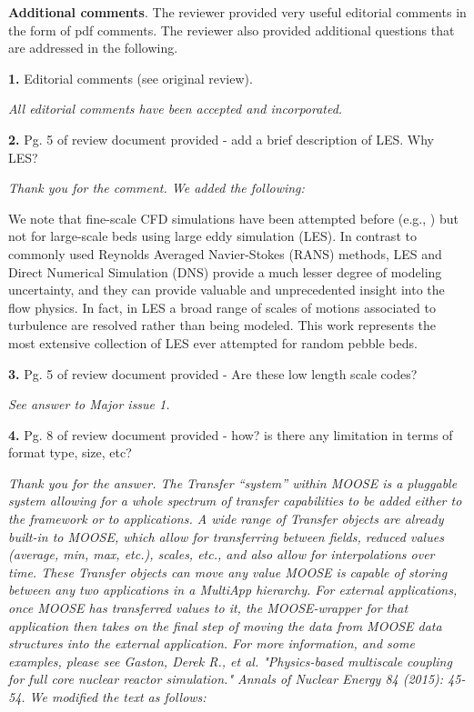 \documentclass{nseJournal}
\begin{document}
\textbf{Additional comments}.  The reviewer provided very useful editorial comments in the form of pdf comments. The reviewer also provided additional questions that are addressed in the following.

\textbf{1.} Editorial comments (see original review).

\textit{All editorial comments have been accepted and incorporated.}

\textbf{2.} Pg. 5 of review document provided - add a brief description of LES. Why LES?

\textit{Thank you for the comment. We added the following:}

We note that fine-scale CFD simulations have been attempted before (e.g., \cite{vanstaden2018}) but not for large-scale beds using large eddy simulation (LES).  In contrast to commonly used  Reynolds Averaged Navier-Stokes (RANS) methods, LES and Direct Numerical Simulation (DNS) provide a much lesser degree of modeling uncertainty, and they can provide valuable and unprecedented insight into the flow physics. In fact, in LES a broad range of scales of motions associated to turbulence are resolved rather than being modeled. This work represents the most extensive collection of LES ever attempted for random pebble beds.

\textbf{3.} Pg. 5 of review document provided - Are these low length scale codes?

\textit{See answer to Major issue 1.}

\textbf{4.} Pg. 8 of review document provided - how? is there any limitation in terms of format type, size, etc?

\textit{Thank you for the answer. The Transfer “system” within MOOSE is a pluggable system allowing for a whole spectrum of transfer capabilities to be added either to the framework or to applications.  A wide range of Transfer objects are already built-in to MOOSE, which allow for transferring between fields, reduced values (average, min, max, etc.), scales, etc., and also allow for interpolations over time.  These Transfer objects can move any value MOOSE is capable of storing between any two applications in a MultiApp hierarchy.  For external applications, once MOOSE has transferred values to it, the MOOSE-wrapper for that application then takes on the final step of moving the data from MOOSE data structures into the external application.  For more information, and some examples, please see  Gaston, Derek R., et al. "Physics-based multiscale coupling for full core nuclear reactor simulation." Annals of Nuclear Energy 84 (2015): 45-54. We modified the text as follows:}
\end{document}

